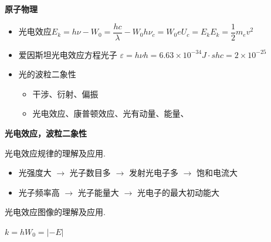 \textbf{原子物理}
\begin{itemize}
\item 光电效应\quad $E_k=h\nu-W_0=\dfrac{hc}{\lambda}-W_0$\quad $h\nu_c=W_0$\quad $eU_c=E_k$\quad $E_k=\dfrac12m_ev^2$
\item 爱因斯坦光电效应方程\quad 光子 $\varepsilon=h\nu$\quad $h=6.63\times10^{-34}\unit{J\cdot s}$\quad $hc=2\times10^{-25}$ %
\item 光的波粒二象性
  \begin{itemize}
  \item[$\to$] 干涉、衍射、偏振 %
  \item[$\to$] 光电效应、康普顿效应、光有动量、能量、 %
  \end{itemize}
\end{itemize}
\textbf{光电效应，波粒二象性} %

光电效应规律的理解及应用.
\begin{itemize}
\item[] 光强度大 $\to$ 光子数目多 $\to$ 发射光电子多 $\to$ 饱和电流大
\item[] 光子频率高 $\to$ 光子能量大 $\to$ 光电子的最大初动能大
\end{itemize}
光电效应图像的理解及应用.

\noindent $k=h$\qquad $W_0=|-E|$


